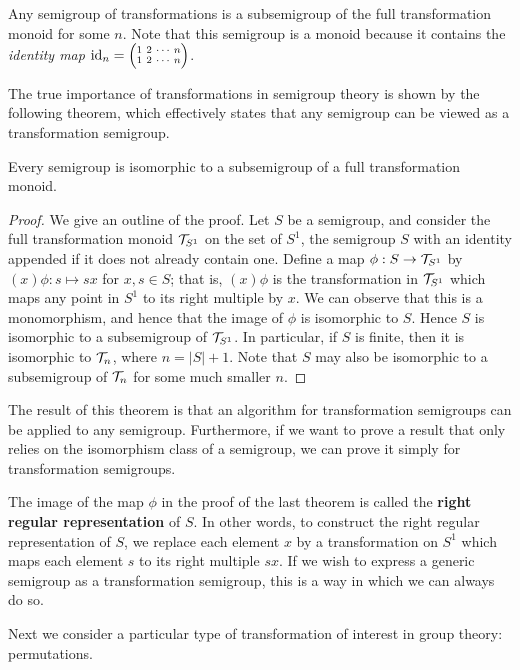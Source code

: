 Any semigroup of transformations is a subsemigroup of the full transformation
monoid for some $n$.  Note that this semigroup is a monoid because it contains
the \textit{identity map} $\id_n = \transN{1}{2}{n}$.

The true importance of transformations in semigroup theory is shown by the
following theorem, which effectively states that any semigroup can be viewed as
a transformation semigroup.

\begin{theorem}
  \label{thm:cayley-semigroups}
  Every semigroup is isomorphic to a subsemigroup of a full transformation
  monoid.
  \begin{proof}
    We give an outline of the proof.  Let $S$ be a semigroup, and consider the
    full transformation monoid $\mathcal{T}_{S^1}$ on the set of $S^1$, the semigroup $S$
    with an identity appended if it does not already contain one.  Define a map
    $\phi: S \to \mathcal{T}_{S^1}$ by $(x)\phi: s \mapsto sx$ for $x,s \in S$; that is,
    $(x)\phi$ is the transformation in $\mathcal{T}_{S^1}$ which maps any point in
    ${S^1}$ to its right multiple by $x$.  We can observe that this is a
    monomorphism, and hence that the image of $\phi$ is isomorphic to $S$.
    Hence $S$ is isomorphic to a subsemigroup of $\mathcal{T}_{S^1}$.  In particular, if
    $S$ is finite, then it is isomorphic to $\mathcal{T}_n$, where $n = |S|+1$.  Note
    that $S$ may also be isomorphic to a subsemigroup of $\mathcal{T}_n$ for some much
    smaller $n$.
  \end{proof}
\end{theorem}

The result of this theorem is that an algorithm for transformation semigroups
can be applied to any semigroup.  Furthermore, if we want to prove a result that
only relies on the isomorphism class of a semigroup, we can prove it simply for
transformation semigroups.

The image of the map $\phi$ in the proof of the last theorem is called the
\textbf{right regular representation} of $S$.  In other words, to construct the
right regular representation of $S$, we replace each element $x$ by a
transformation on $S^1$ which maps each element $s$ to its right multiple $sx$.
If we wish to express a generic semigroup as a transformation semigroup, this is
a way in which we can always do so.

Next we consider a particular type of transformation of interest in group
theory: permutations.

